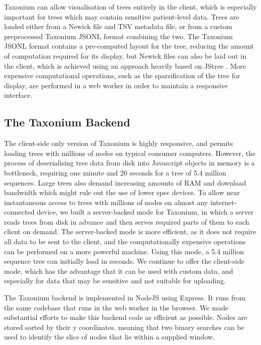 Taxonium can allow visualisation of trees entirely in the client, which is especially important for trees which may contain sensitive patient-level data. Trees are loaded either from a Newick file and TSV metadata file, or from a custom preprocessed Taxonium JSONL format combining the two. The Taxonium JSONL format contains a pre-computed layout for the tree, reducing the amount of computation required for its display, but Newick files can also be laid out in the client, which is achieved using an approach heavily based on JStree \citep{jstree}. More expensive computational operations, such as the sparsification of the tree for display, are performed in a web worker in order to maintain a responsive interface.

\subsection*{The Taxonium Backend}

The client-side only version of Taxonium is highly responsive, and permits loading trees with millions of nodes on typical consumer computers. However, the process of deserialising tree data from disk into Javascript objects in memory is a bottleneck, requiring one minute and 20 seconds for a tree of 5.4 million sequences. Large trees also demand increasing amounts of RAM and download bandwidth which might rule out the use of lower spec devices. To allow near instantaneous access to trees with millions of nodes on almost any internet-connected device, we built a server-backed mode for Taxonium, in which a server reads trees from disk in advance and then serves required parts of them to each client on demand. The server-backed mode is more efficient, as it does not require all data to be sent to the client, and the computationally expensive operations can be performed on a more powerful machine. Using this mode, a 5.4 million sequence tree can initially load in seconds. We continue to offer the client-side mode, which has the advantage that it can be used with custom data, and especially for data that may be sensitive and not suitable for uploading.



The Taxonium backend is implemented in NodeJS using Express. It runs from the same codebase that runs in the web worker in the browser. We made substantial efforts to make this backend code as efficient as possible. Nodes are stored sorted by their y coordinates, meaning that two binary searches can be used to identify the slice of nodes that lie within a supplied window.

